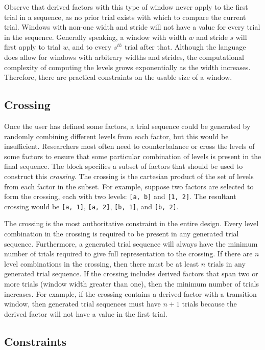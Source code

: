 Observe that derived factors with this type of window never apply to the first trial in a sequence, as no prior trial exists with which to compare the current trial. Windows with non-one width and stride will not have a value for every trial in the sequence. Generally speaking, a window with width $w$ and stride $s$ will first apply to trial $w$, and to every $s^{th}$ trial after that. Although the language does allow for windows with arbitrary widths and strides, the computational complexity of computing the levels grows exponentially as the width increases. Therefore, there are practical constraints on the usable size of a window.

\subsection{Crossing}

Once the user has defined some factors, a trial sequence could be generated by randomly combining different levels from each factor, but this would be insufficient. Researchers most often need to counterbalance or cross the levels of some factors to ensure that some particular combination of levels is present in the final sequence. The block specifies a subset of factors that should be used to construct this \textit{crossing}. The crossing is the cartesian product of the set of levels from each factor in the subset. For example, suppose two factors are selected to form the crossing, each with two levels: \texttt{[a, b]} and \texttt{[1, 2]}. The resultant crossing would be \texttt{[a, 1]}, \texttt{[a, 2]}, \texttt{[b, 1]}, and \texttt{[b, 2]}.

The crossing is the most authoritative constraint in the entire design. Every level combination in the crossing is required to be present in any generated trial sequence. Furthermore, a generated trial sequence will always have the minimum number of trials required to give full representation to the crossing. If there are $n$ level combinations in the crossing, then there must be at least $n$ trials in any generated trial sequence. If the crossing includes derived factors that span two or more trials (window width greater than one), then the minimum number of trials increases. For example, if the crossing contains a derived factor with a transition window, then generated trial sequences must have $n+1$ trials because the derived factor will not have a value in the first trial.

\subsection{Constraints}

